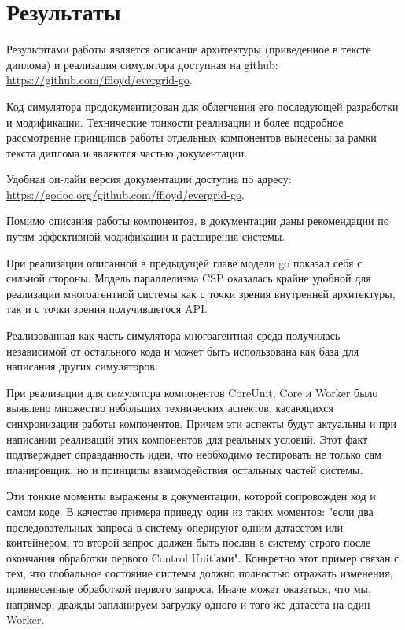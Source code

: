 \chapter{Результаты}

Результатами работы является описание архитектуры (приведенное в тексте диплома) и реализация симулятора доступная на github: \url{https://github.com/ffloyd/evergrid-go}.

Код симулятора продокументирован для облегчения его последующей разработки и модификации. Технические тонкости реализации и более подробное рассмотрение принципов работы отдельных компонентов вынесены за рамки текста диплома и являются частью документации.

Удобная он-лайн версия документации доступна по адресу: \url{https://godoc.org/github.com/ffloyd/evergrid-go}.

Помимо описания работы компонентов, в документации даны рекомендации по путям эффективной модификации и расширения системы.

При реализации описанной в предыдущей главе модели go показал себя с сильной стороны. Модель параллелизма CSP оказалась крайне удобной для реализации многоагентной системы как с точки зрения внутренней архитектуры, так и с точки зрения получившегося API.

Реализованная как часть симулятора многоагентная среда получилась независимой от остального кода и может быть использована как база для написания других симуляторов.

При реализации для симулятора компонентов CoreUnit, Core и Worker было выявлено множество небольших технических аспектов, касающихся синхронизации работы компонентов. Причем эти аспекты будут актуальны и при написании реализаций этих компонентов для реальных условий. Этот факт подтверждает оправданность идеи, что необходимо тестировать не только сам планировщик, но и принципы взаимодействия остальных частей системы.

Эти тонкие моменты выражены в документации, которой сопровожден код и самом коде. В качестве примера приведу один из таких моментов: "если два последовательных запроса в систему оперируют одним датасетом или контейнером, то второй запрос должен быть послан в систему строго после окончания обработки первого Control Unit'ами". Конкретно этот пример связан с тем, что глобальное состояние системы должно полностью отражать изменения, привнесенные обработкой первого запроса. Иначе может оказаться, что мы, например, дважды запланируем загрузку одного и того же датасета на один Worker.

